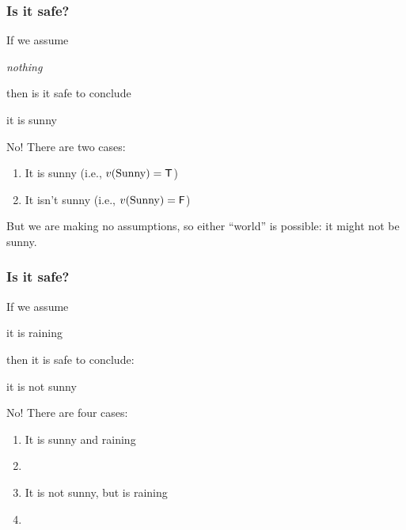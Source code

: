 \documentclass[xetex,aspectratio=169,14pt,hyperref={pdfpagelabels=true,pdflang={en-GB}}]{beamer}
\begin{document}
\begin{frame}[t]
  \frametitle{Is it safe?}

  If we assume
  \begin{center}
    \emph{nothing}
  \end{center}
  then is it safe to conclude
  \begin{center}
    it is sunny
  \end{center}

  \bigskip
  \pause

  No! \pause There are two cases:
  \begin{enumerate}
  \item It is sunny  (i.e., $v(\mathrm{Sunny}) = \mathsf{T}$)
  \item It isn't sunny (i.e., $v(\mathrm{Sunny}) = \mathsf{F}$)
  \end{enumerate}
  \pause But we are making no assumptions, so either ``world'' is
  possible: it might not be sunny.
\end{frame}

\begin{frame}[t]
  \frametitle{Is it safe?}

  If we assume
  \begin{center}
    it is raining
  \end{center}
  then it is safe to conclude:
  \begin{center}
    it is not sunny
  \end{center}

  \bigskip
  \pause

  No! \pause There are four cases:
  \begin{enumerate}
  \item It is sunny and raining
  \item {}
  \item It is not sunny, but is raining
  \item {}
  \end{enumerate}
  \pause %
\end{frame}
\end{document}
